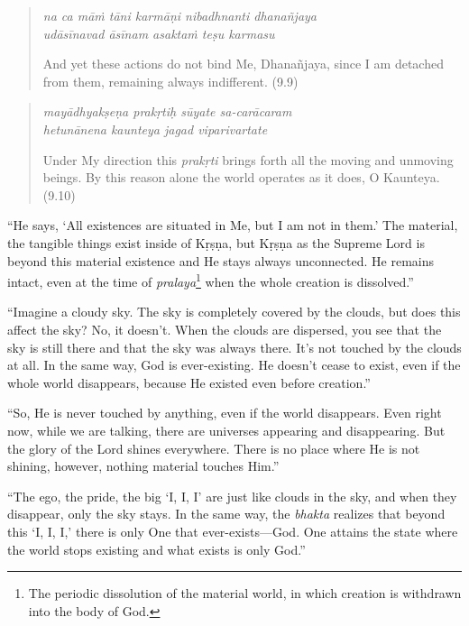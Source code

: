 \documentclass[12pt, twoside, openright]{memoir}
\begin{document}
\par
\begin{verse}
\textit{na ca māṁ tāni karmāṇi nibadhnanti dhanañjaya} \\
\textit{udāsīnavad āsīnam asaktaṁ teṣu karmasu}

\noindent And yet these actions do not bind Me, Dhanañjaya, since I am detached from them, remaining always indifferent. (9.9)
\end{verse}
\par



\par
\begin{verse}
\textit{mayādhyakṣeṇa prakṛtiḥ sūyate sa-carācaram} \\
\textit{hetunānena kaunteya jagad viparivartate}

\noindent Under My direction this \textit{prakṛti} brings forth all the moving and unmoving beings. By this reason alone the world operates as it does, O Kaunteya. (9.10)
\end{verse}
\par


\enquote{He says, \enquote{All existences are situated in Me, but I am not in them.} The material, the tangible things exist inside of Kṛṣṇa, but Kṛṣṇa as the Supreme Lord is beyond this material existence and He stays always unconnected. He remains intact, even at the time of \textit{pralaya}\footnote{The periodic dissolution of the material world, in which creation is withdrawn into the body of God.} when the whole creation is dissolved.}

\enquote{Imagine a cloudy sky. The sky is completely covered by the clouds, but does this affect the sky? No, it doesn’t. When the clouds are dispersed, you see that the sky is still there and that the sky was always there. It’s not touched by the clouds at all. In the same way, God is ever-existing. He doesn’t cease to exist, even if the whole world disappears, because He existed even before creation.}

\enquote{So, He is never touched by anything, even if the world disappears. Even right now, while we are talking, there are universes appearing and disappearing. But the glory of the Lord shines everywhere. There is no place where He is not shining, however, nothing material touches Him.}

\enquote{The ego, the pride, the big \enquote{I, I, I} are just like clouds in the sky, and when they disappear, only the sky stays. In the same way, the \textit{bhakta} realizes that beyond this \enquote{I, I, I,} there is only One that ever-exists---God. One attains the state where the world stops existing and what exists is only God.}
\end{document}
